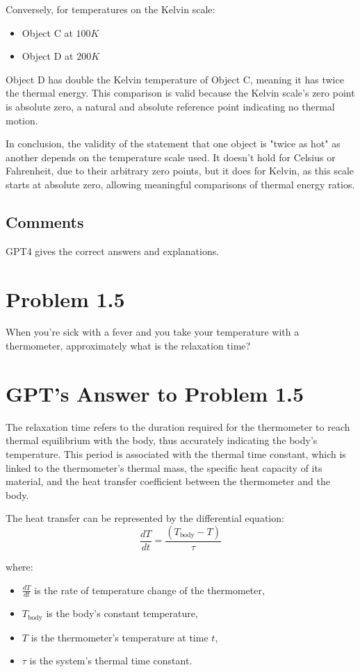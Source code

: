 \documentclass[12pt]{article}
\begin{document}
Conversely, for temperatures on the Kelvin scale:
\begin{itemize}
    \item Object C at $100 K$
    \item Object D at $200 K$
\end{itemize}

Object D has double the Kelvin temperature of Object C, meaning it has twice the thermal energy. This comparison is valid because the Kelvin scale's zero point is absolute zero, a natural and absolute reference point indicating no thermal motion.

In conclusion, the validity of the statement that one object is "twice as hot" as another depends on the temperature scale used. It doesn't hold for Celsius or Fahrenheit, due to their arbitrary zero points, but it does for Kelvin, as this scale starts at absolute zero, allowing meaningful comparisons of thermal energy ratios.

\subsection*{Comments}

GPT4 gives the correct answers and explanations.

\section*{Problem 1.5}

When you’re sick with a fever and you take your temperature with a thermometer, approximately what is the relaxation time?

\section*{GPT's Answer to Problem 1.5}

The relaxation time refers to the duration required for the thermometer to reach thermal equilibrium with the body, thus accurately indicating the body's temperature. This period is associated with the thermal time constant, which is linked to the thermometer's thermal mass, the specific heat capacity of its material, and the heat transfer coefficient between the thermometer and the body.

The heat transfer can be represented by the differential equation:
\[
\frac{dT}{dt} = \frac{(T_{\text{body}} - T)}{\tau}
\]

where:
\begin{itemize}
    \item \( \frac{dT}{dt} \) is the rate of temperature change of the thermometer,
    \item \( T_{\text{body}} \) is the body’s constant temperature,
    \item \( T \) is the thermometer’s temperature at time \( t \),
    \item \( \tau \) is the system’s thermal time constant.
\end{itemize}
\end{document}
